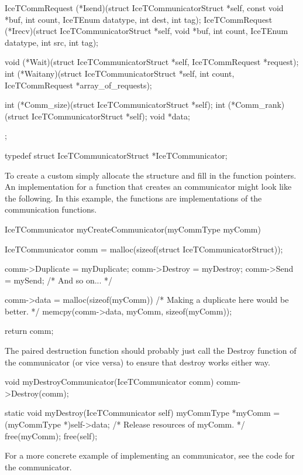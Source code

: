 \begin{code}
{    IceTCommRequest (*Isend)(struct IceTCommunicatorStruct *self,
                             const void *buf,
                             int count,
                             IceTEnum datatype,
                             int dest,
                             int tag);
    IceTCommRequest (*Irecv)(struct IceTCommunicatorStruct *self,
                             void *buf,
                             int count,
                             IceTEnum datatype,
                             int src,
                             int tag);

    void (*Wait)(struct IceTCommunicatorStruct *self, IceTCommRequest *request);
    int  (*Waitany)(struct IceTCommunicatorStruct *self,
                    int count, IceTCommRequest *array_of_requests);

    int  (*Comm_size)(struct IceTCommunicatorStruct *self);
    int  (*Comm_rank)(struct IceTCommunicatorStruct *self);
    void *data;
};

typedef struct IceTCommunicatorStruct *IceTCommunicator;
\end{code}

To create a custom  simply allocate the structure
and fill in the function pointers.  An implementation for a function that
creates an \IceT communicator might look like the following.  In this
example, the  functions are implementations of the communication
functions. 

\begin{code}
IceTCommunicator myCreateCommunicator(myCommType myComm)
{
  IceTCommunicator comm = malloc(sizeof(struct IceTCommunicatorStruct));

  comm->Duplicate = myDuplicate;
  comm->Destroy = myDestroy;
  comm->Send = mySend;
  /* And so on... */

  comm->data = malloc(sizeof(myComm))
  /* Making a duplicate here would be better. */
  memcpy(comm->data, myComm, sizeof(myComm));

  return comm;
}
\end{code}

The paired destruction function should probably just call the Destroy
function of the communicator (or vice versa) to ensure that destroy works
either way.

\begin{code}
void myDestroyCommunicator(IceTCommunicator comm)
{
  comm->Destroy(comm);
}
\end{code}

\begin{code}
static void myDestroy(IceTCommunicator self)
{
  myCommType *myComm = (myCommType *)self->data;
  /* Release resources of myComm. */
  free(myComm);
  free(self);
}
\end{code}

For a more concrete example of implementing an \IceT communicator, see the
\IceT code for the \MPI communicator.
